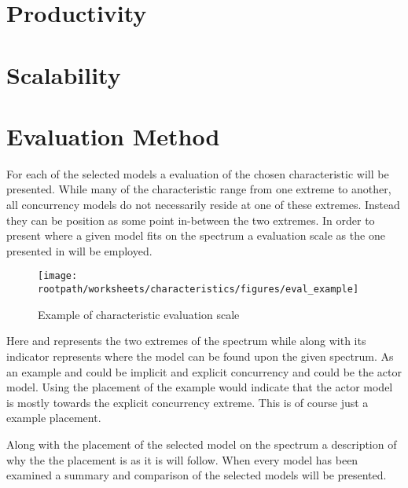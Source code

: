 \section{Productivity}

\section{Scalability}

\section{Evaluation Method}
For each of the selected models a evaluation of the chosen characteristic will be presented. While many of the characteristic range from one extreme to another, all concurrency models do not necessarily reside at one of these extremes. Instead they can be position as some point in-between the two extremes. In order to present where a given model fits on the spectrum a evaluation scale as the one presented in  will be employed. 

\begin{figure}[ht!]
\centering
\texttt{[image: \\rootpath/worksheets/characteristics/figures/eval\_example]}
\caption{Example of characteristic evaluation scale}\label{fig:char_evel_example}
\end{figure}

Here  and  represents the two extremes of the spectrum while  along with its indicator represents where the model  can be found upon the given spectrum. As an example  and  could be implicit and explicit concurrency and  could be the actor model. Using the placement of the example  would indicate that the actor model is mostly towards the explicit concurrency extreme. This is of course just a example placement.

Along with the placement of the selected model on the spectrum a description of why the the placement is as it is will follow. When every model has been examined a summary and comparison of the selected models will be presented.


\worksheetend
